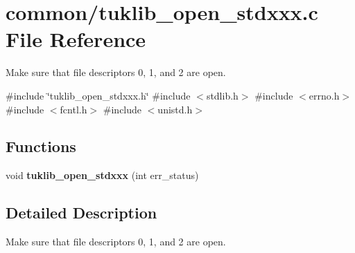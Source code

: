 \section{common/tuklib\+\_\+open\+\_\+stdxxx.c File Reference}
\label{tuklib__open__stdxxx_8c}


Make sure that file descriptors 0, 1, and 2 are open.  


{\ttfamily \#include \char`\"{}tuklib\+\_\+open\+\_\+stdxxx.\+h\char`\"{}}\newline
{\ttfamily \#include $<$stdlib.\+h$>$}\newline
{\ttfamily \#include $<$errno.\+h$>$}\newline
{\ttfamily \#include $<$fcntl.\+h$>$}\newline
{\ttfamily \#include $<$unistd.\+h$>$}\newline
\subsection*{Functions}
\begin{DoxyCompactItemize}
\item 
\mbox{\label{tuklib__open__stdxxx_8c_a8baa8536f3713be6b84596acc12b5b39}} 
void {\bfseries tuklib\+\_\+open\+\_\+stdxxx} (int err\+\_\+status)
\end{DoxyCompactItemize}


\subsection{Detailed Description}
Make sure that file descriptors 0, 1, and 2 are open. 

